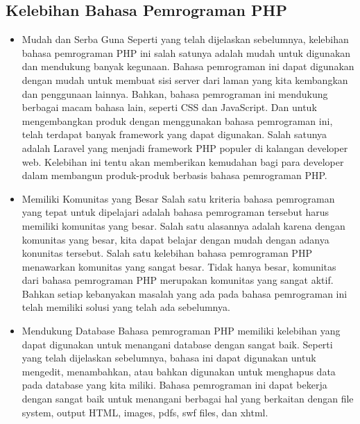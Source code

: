 \subsection{Kelebihan Bahasa Pemrograman PHP}
  \begin{itemize}
    \item Mudah dan Serba Guna
      Seperti yang telah dijelaskan sebelumnya, kelebihan bahasa pemrograman PHP ini salah satunya adalah mudah untuk digunakan dan mendukung banyak kegunaan. Bahasa pemrograman ini dapat digunakan dengan mudah untuk membuat sisi server dari laman yang kita kembangkan dan penggunaan lainnya. Bahkan, bahasa pemrograman ini mendukung berbagai macam bahasa lain, seperti CSS dan JavaScript.
      Dan untuk mengembangkan produk dengan menggunakan bahasa pemrograman ini, telah terdapat banyak framework yang dapat digunakan. Salah satunya adalah Laravel yang menjadi framework PHP populer di kalangan developer web. Kelebihan ini tentu akan memberikan kemudahan bagi para developer dalam membangun produk-produk berbasis bahasa pemrograman PHP.
    \item Memiliki Komunitas yang Besar
      Salah satu kriteria bahasa pemrograman yang tepat untuk dipelajari adalah bahasa pemrograman tersebut harus memiliki komunitas yang besar. Salah satu alasannya adalah karena dengan komunitas yang besar, kita dapat belajar dengan mudah dengan adanya konunitas tersebut.
      Salah satu kelebihan bahasa pemrograman PHP menawarkan komunitas yang sangat besar. Tidak hanya besar, komunitas dari bahasa pemrograman PHP merupakan komunitas yang sangat aktif. Bahkan setiap kebanyakan masalah yang ada pada bahasa pemrograman ini telah memiliki solusi yang telah ada sebelumnya.
    \item Mendukung Database
     Bahasa pemrograman PHP memiliki kelebihan yang dapat digunakan untuk menangani database dengan sangat baik. Seperti yang telah dijelaskan sebelumnya, bahasa ini dapat digunakan untuk mengedit, menambahkan, atau bahkan digunakan untuk menghapus data pada database yang kita miliki.
     Bahasa pemrograman ini dapat bekerja dengan sangat baik untuk menangani berbagai hal yang berkaitan dengan file system, output HTML, images, pdfs, swf files, dan xhtml.
  \end{itemize}
